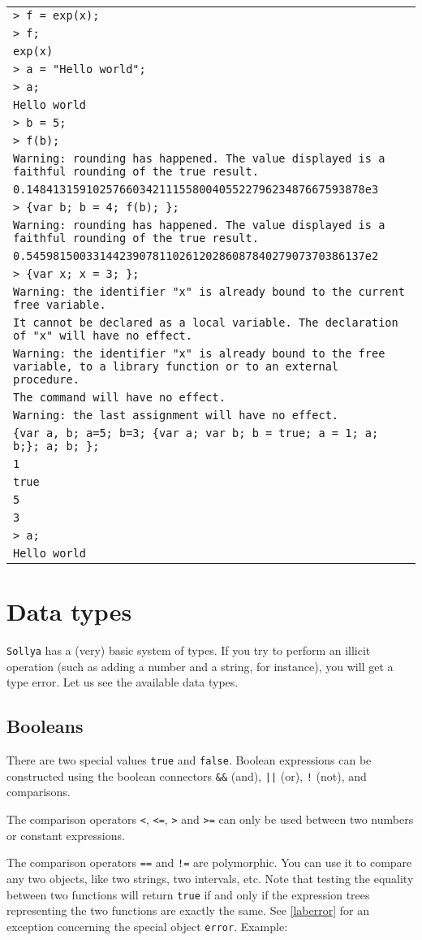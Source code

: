 \documentclass[a4paper]{article}
\newcommand{\key}[1]{\texttt{#1}}
\newcommand{\sollya}{\texttt{Sollya}\xspace}
\newcommand{\code}[1]{
\begin{center}
\begin{tabular}{|p{14.8cm}|}
\hline
#1
\hline
\end{tabular}
\end{center}
}
\newcommand{\ligne}[1]{\texttt{#1}\\}
\begin{document}
\code{
\ligne{> f = exp(x);}
\ligne{> f;}
\ligne{exp(x)}
\ligne{> a = "Hello world";}
\ligne{> a;}
\ligne{Hello world}
\ligne{> b = 5;}
\ligne{> f(b);}
\ligne{Warning: rounding has happened. The value displayed is a faithful rounding of the true result.}
\ligne{0.148413159102576603421115580040552279623487667593878e3}
\ligne{> \{var b; b = 4; f(b); \};}
\ligne{Warning: rounding has happened. The value displayed is a faithful rounding of the true result.}
\ligne{0.545981500331442390781102612028608784027907370386137e2}
\ligne{> \{var x; x = 3; \};}
\ligne{Warning: the identifier "x" is already bound to the current free variable.}
\ligne{It cannot be declared as a local variable. The declaration of "x" will have no effect.}
\ligne{Warning: the identifier "x" is already bound to the free variable, to a library function or to an external procedure.}
\ligne{The command will have no effect.}
\ligne{Warning: the last assignment will have no effect.}
\ligne{\{var a, b; a=5; b=3; \{var a; var b; b = true; a = 1; a; b;\}; a; b; \};}
\ligne{1}
\ligne{true}
\ligne{5}
\ligne{3}
\ligne{> a;}
\ligne{Hello world}
}


\section{Data types}
\sollya has a (very) basic system of types. If you try to perform an illicit operation (such as adding a number and a string, for instance), you will get a type error. Let us see the available data types.

\subsection{Booleans}
There are two special values \key{true} and \key{false}. Boolean expressions can be constructed using the boolean connectors \key{\&\&} (and), \key{||} (or), \key{!} (not), and comparisons.

The comparison operators \key{<}, \key{<=}, \key{>} and \key{>=} can only be used between two numbers or constant expressions.

The comparison operators \key{==} and \key{!=} are polymorphic. You can use it to compare any two objects, like two strings, two intervals, etc. Note that testing the equality between two functions will return \key{true} if and only if the expression trees representing the two functions are exactly the same. See \ref{laberror} for an exception concerning the special object \key{error}. Example:
\end{document}
